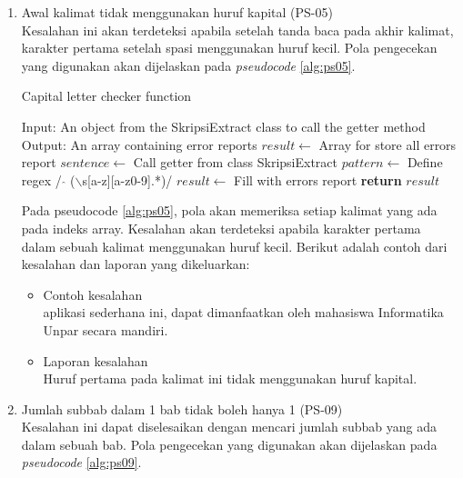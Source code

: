 \begin{enumerate}
	\item Awal kalimat tidak menggunakan huruf kapital (PS-05) \\
	Kesalahan ini akan terdeteksi apabila setelah tanda baca pada akhir kalimat, karakter pertama setelah spasi menggunakan huruf kecil. Pola pengecekan yang digunakan akan dijelaskan pada \textit{pseudocode} \ref{alg:ps05}.

\begin{minipage}{1.0\linewidth}
\begin{algorithm}[H]
    \caption{Capital letter checker function}
	\label{alg:ps05}
	\begin{algorithmic}[1]
    		\State Input: An object from the SkripsiExtract class to call the getter method
			\State Output: An array containing error reports
			\State $result \gets$ Array for store all errors report
			\State $sentence \gets$ Call getter from class SkripsiExtract
				\State $pattern \gets$ Define regex / $\hat{}$ ($\backslash$s[a-z][a-z0-9].*)/
                	\State $result \gets$ Fill with errors report
            	\EndIf
        	\EndFor
    		\State \textbf{return} $result$
    	\EndFunction
	\end{algorithmic}
\end{algorithm}
\end{minipage}
\medskip

	Pada pseudocode \ref{alg:ps05}, pola akan memeriksa setiap kalimat yang ada pada indeks array. Kesalahan akan terdeteksi apabila karakter pertama dalam sebuah kalimat menggunakan huruf kecil. Berikut adalah contoh dari kesalahan dan laporan yang dikeluarkan:
	
	\begin{itemize}
		\item Contoh kesalahan \\ 
		aplikasi sederhana ini, dapat dimanfaatkan oleh mahasiswa Informatika Unpar secara mandiri.
		\item Laporan kesalahan \\
		Huruf pertama pada kalimat ini tidak menggunakan huruf kapital.
	\end{itemize}
	
	\item Jumlah subbab dalam 1 bab tidak boleh hanya 1 (PS-09) \\
	Kesalahan ini dapat diselesaikan dengan mencari jumlah subbab yang ada dalam sebuah bab. Pola pengecekan yang digunakan akan dijelaskan pada \textit{pseudocode} \ref{alg:ps09}.


\end{enumerate}
